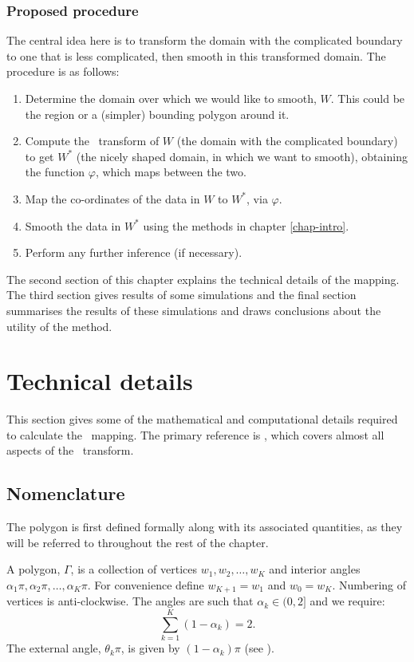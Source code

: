 \subsubsection{Proposed procedure}

The central idea here is to transform the domain with the complicated boundary to one that is less complicated, then smooth in this transformed domain. The procedure is as follows:

\begin{enumerate}
\item Determine the domain over which we would like to smooth, $W$. This could be the region or a (simpler) bounding polygon around it.
\item Compute the \sch\ transform of $W$ (the domain with the complicated boundary) to get $W^*$ (the nicely shaped domain, in which we want to smooth), obtaining the function $\varphi$, which maps between the two.
\item Map the co-ordinates of the data in $W$ to $W^*$, via $\varphi$.
\item Smooth the data in $W^*$ using the methods in chapter \ref{chap-intro}.
\item Perform any further inference (if necessary).
\end{enumerate}

The second section of this chapter explains the technical details of the mapping. The third section gives results of some simulations and the final section summarises the results of these simulations and draws conclusions about the utility of the method.

\section{Technical details}

This section gives some of the mathematical and computational details required to calculate the \sch\ mapping. The primary reference is , which covers almost all aspects of the \sch\ transform.

\subsection{Nomenclature}
\label{sc-nomen}

The polygon is first defined formally along with its associated quantities, as they will be referred to throughout the rest of the chapter.

A polygon, $\Gamma$, is a collection of vertices $w_1, w_2,\ldots,w_K$ and interior angles $\alpha_1\pi, \alpha_2\pi, \ldots, \alpha_K\pi$. For convenience define $w_{K+1} = w_1$ and $w_0=w_K$. Numbering of vertices is anti-clockwise. The angles are such that $\alpha_k \in (0,2]$ and we require:
\begin{equation}
\sum_{k=1}^K (1-\alpha_k) = 2.
\end{equation}
The external angle, $\theta_k\pi$, is given by $(1-\alpha_k)\pi$ (see ). 

